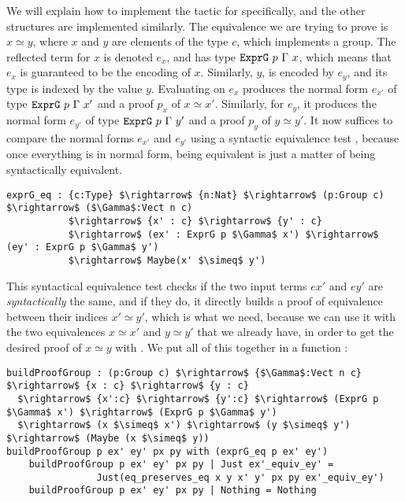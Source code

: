 We will explain how to implement the tactic for  specifically,
and the other structures are implemented similarly.
The equivalence we are trying to prove is $x \simeq y$, where $x$ and $y$ are
elements of the type $c$, which implements a group. The reflected term for $x$
is denoted $e_x$, and has type ${\mbox{\texttt{ExprG}}}\ p\
\Gamma\ x$, which means that $e_x$ is guaranteed to be the encoding of $x$.  
Similarly,
$y$, is encoded by $e_y$, and its type is indexed by the
value $y$.  Evaluating  on $e_x$ produces the
normal form $e_{x'}$ of type ${\mbox{\texttt{ExprG}}}\ p\ \Gamma\ x'$ and a proof $p_x$ of
$x \simeq x'$.
Similarly, for $e_y$, it produces
the normal form $e_{y'}$ of type ${\mbox{\texttt{ExprG}}}\ p\ \Gamma\ y'$ and a proof
$p_y$ of $y \simeq y'$.  It now suffices to compare the normal forms $e_{x'}$ and $e_{y'}$ using a syntactic equivalence test , because once everything is in normal form, being equivalent is just a matter of being syntactically equivalent.

\begin{lstlisting}
exprG_eq : {c:Type} $\rightarrow$ {n:Nat} $\rightarrow$ (p:Group c) $\rightarrow$ ($\Gamma$:Vect n c) 
           $\rightarrow$ {x' : c} $\rightarrow$ {y' : c} 
           $\rightarrow$ (ex' : ExprG p $\Gamma$ x') $\rightarrow$ (ey' : ExprG p $\Gamma$ y') 
           $\rightarrow$ Maybe(x' $\simeq$ y')
\end{lstlisting}
This syntactical equivalence test checks if the two input terms $ex'$ and $ey'$ are \emph{syntactically} the same, and if they do, it directly builds a proof of equivalence between their indices $x' \simeq y'$, which is what we need, because we can use it 
with the two equivalences $x \simeq x'$ and $y\simeq y'$ that we already have, in order to get the desired proof of $x \simeq y$ with \code{eq\_preserves\_eq}. We put all of this together in a function \code{buildProofGroup}:

\begin{lstlisting}
buildProofGroup : (p:Group c) $\rightarrow$ {$\Gamma$:Vect n c} $\rightarrow$ {x : c} $\rightarrow$ {y : c} 
  $\rightarrow$ {x':c} $\rightarrow$ {y':c} $\rightarrow$ (ExprG p $\Gamma$ x') $\rightarrow$ (ExprG p $\Gamma$ y') 
  $\rightarrow$ (x $\simeq$ x') $\rightarrow$ (y $\simeq$ y') $\rightarrow$ (Maybe (x $\simeq$ y))
buildProofGroup p ex' ey' px py with (exprG_eq p ex' ey')
    buildProofGroup p ex' ey' px py | Just ex'_equiv_ey' = 
                Just(eq_preserves_eq x y x' y' px py ex'_equiv_ey')
    buildProofGroup p ex' ey' px py | Nothing = Nothing
\end{lstlisting}

